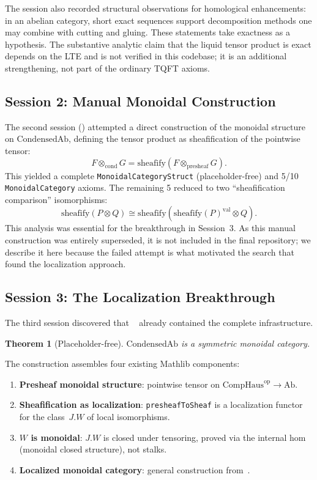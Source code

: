 \documentclass[11pt]{amsart}
\theoremstyle{plain}
\newtheorem{theorem}{Theorem}[section]
\theoremstyle{definition}
\newcommand{\CondAb}{\mathrm{CondensedAb}}
\newcommand{\CompHaus}{\mathrm{CompHaus}}
\newcommand{\Ab}{\mathrm{Ab}}
\newcommand{\op}{\mathrm{op}}
\begin{document}
The session also recorded structural observations for homological enhancements: in an abelian category, short exact sequences support decomposition methods one may combine with cutting and gluing. These statements take exactness as a hypothesis. The substantive analytic claim that the liquid tensor product is exact depends on the LTE and is not verified in this codebase; it is an additional strengthening, not part of the ordinary TQFT axioms.

\subsection{Session 2: Manual Monoidal Construction}

The second session () attempted a direct construction of the monoidal structure on $\CondAb$, defining the tensor product as sheafification of the pointwise tensor:
\[
F \otimes_{\mathrm{cond}} G = \mathrm{sheafify}(F \otimes_{\mathrm{presheaf}} G).
\]
This yielded a complete \texttt{MonoidalCategoryStruct} (placeholder-free) and 5/10 \texttt{MonoidalCategory} axioms. The remaining 5 reduced to two ``sheafification comparison'' isomorphisms:
\[
\mathrm{sheafify}(P \otimes Q) \cong \mathrm{sheafify}(\mathrm{sheafify}(P)^{\mathrm{val}} \otimes Q).
\]
This analysis was essential for the breakthrough in Session~3. As this manual construction was entirely superseded, it is not included in the final repository; we describe it here because the failed attempt is what motivated the search that found the localization approach.

\subsection{Session 3: The Localization Breakthrough}

The third session discovered that ~\cite{MatlibSitesMon} already contained the complete infrastructure.

\begin{theorem}[Placeholder-free]
\label{thm:monoidal}
$\CondAb$ is a symmetric monoidal category.
\end{theorem}

The construction assembles four existing Mathlib components:
\begin{enumerate}
\item \textbf{Presheaf monoidal structure}: pointwise tensor on $\CompHaus^{\op} \to \Ab$.
\item \textbf{Sheafification as localization}: \texttt{presheafToSheaf} is a localization functor for the class~$J.W$ of local isomorphisms.
\item \textbf{$W$ is monoidal}: $J.W$ is closed under tensoring, proved via the internal hom (monoidal closed structure), not stalks.
\item \textbf{Localized monoidal category}: general construction from~\cite{MatlibLocMon}.
\end{enumerate}
\end{document}
